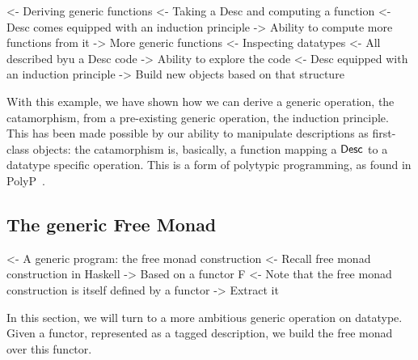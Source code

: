 
\begin{wstructure}
<- Deriving generic functions
    <- Taking a Desc and computing a function
        <- Desc comes equipped with an induction principle
        -> Ability to compute more functions from it
            -> More generic functions
    <- Inspecting datatypes
        <- All described byu a Desc code
        -> Ability to explore the code
            <- Desc equipped with an induction principle
            -> Build new objects based on that structure
\end{wstructure}

With this example, we have shown how we can derive a generic
operation, the catamorphism, from a pre-existing generic operation,
the induction principle. This has been made possible by our ability to
manipulate descriptions as first-class objects: the catamorphism is,
basically, a function mapping a $\Desc$ to a datatype specific
operation. This is a form of polytypic programming, as found in
PolyP~\cite{jansson:polyp}.


\subsection{The generic Free Monad}
\label{sec:desc-free-monad}

\begin{wstructure}
<- A generic program: the free monad construction
    <- Recall free monad construction in Haskell
        -> Based on a functor F
    <- Note that the free monad construction is itself defined by a functor
        -> Extract it
\end{wstructure}

In this section, we will turn to a more ambitious generic operation on
datatype. Given a functor, represented as a tagged description, we
build the free monad over this functor.

